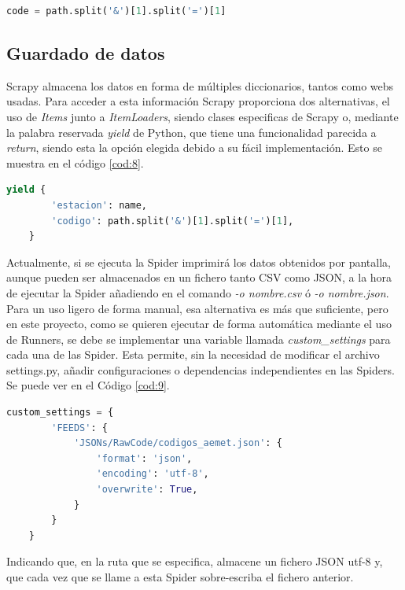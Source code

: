 \begin{lstlisting}[language=Python, caption={Filtrado del código de estación de la URL en Aemet}, label=cod:7]
	code = path.split('&')[1].split('=')[1]
\end{lstlisting}

\subsection{Guardado de datos}
Scrapy almacena los datos en forma de múltiples diccionarios, tantos como webs usadas. Para acceder a esta información Scrapy proporciona dos alternativas, el uso de \textit{Items} junto a \textit{ItemLoaders}, siendo clases especificas de Scrapy o, mediante la palabra reservada \textit{yield} de Python, que tiene una funcionalidad parecida a \textit{return}, siendo esta la opción elegida debido a su fácil implementación. Esto se muestra en el código \ref{cod:8}.

\begin{lstlisting}[language=Python, caption={Guardar datos mediante el uso de \textit{yield}}, label=cod:8]
	yield {
		'estacion': name,
		'codigo': path.split('&')[1].split('=')[1],
	}
\end{lstlisting}

Actualmente, si se ejecuta la Spider imprimirá los datos obtenidos por pantalla, aunque pueden ser almacenados en un fichero tanto CSV como JSON, a la hora de ejecutar la Spider añadiendo en el comando \textit{-o nombre.csv} ó \textit{-o nombre.json}.\newline
\newline
Para un uso ligero de forma manual, esa alternativa es más que suficiente, pero en este proyecto, como se quieren ejecutar de forma automática mediante el uso de Runners, se debe se implementar una variable llamada \textit{custom\_settings} para cada una de las Spider. Esta permite, sin la necesidad de modificar el archivo settings.py, añadir configuraciones o dependencias independientes en las Spiders. Se puede ver en el Código \ref{cod:9}.

\begin{lstlisting}[language=Python, caption={Confugurar guardado en JSON mediante \textit{custom\_settings}}, label=cod:9]
	custom_settings = {
		'FEEDS': {
			'JSONs/RawCode/codigos_aemet.json': {
				'format': 'json',
				'encoding': 'utf-8',
				'overwrite': True,
			}
		}
	}
\end{lstlisting}

Indicando que, en la ruta que se especifica, almacene un fichero JSON utf-8 y, que cada vez que se llame a esta Spider sobre-escriba el fichero anterior.

